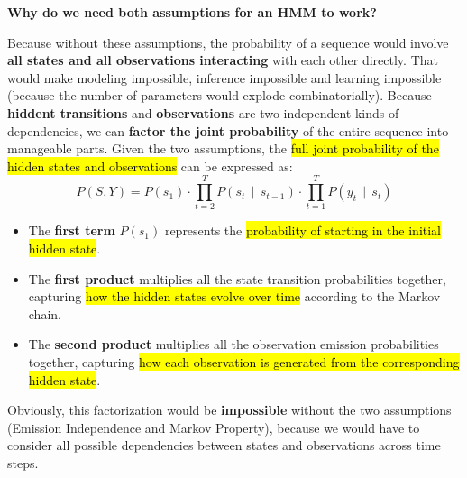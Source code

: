 \begin{flushleft}
    \textcolor{Green3}{ \textbf{Why do we need both assumptions for an HMM to work?}}
\end{flushleft}
Because without these assumptions, the probability of a sequence would involve \textbf{all states and all observations interacting} with each other directly. That would make modeling impossible, inference impossible and learning impossible (because the number of parameters would explode combinatorially). Because \textbf{hiddent transitions} and \textbf{observations} are two independent kinds of dependencies, we can \textbf{factor the joint probability} of the entire sequence into manageable parts. Given the two assumptions, the \hl{full joint probability of the hidden states and observations} can be expressed as:
\begin{equation}
    P\left(S, Y\right) = P\left(s_1\right) \cdot \prod_{t=2}^{T} P\left(s_t \, \mid \, s_{t-1}\right) \cdot \prod_{t=1}^{T} P\left(y_t \, \mid \, s_t\right)
\end{equation}
\begin{itemize}
    \item The \textbf{first term} $P\left(s_1\right)$ represents the \hl{probability of starting in the initial hidden state}.
    \item The \textbf{first product} multiplies all the state transition probabilities together, capturing \hl{how the hidden states evolve over time} according to the Markov chain.
    \item The \textbf{second product} multiplies all the observation emission probabilities together, capturing \hl{how each observation is generated from the corresponding hidden state}.
\end{itemize}
Obviously, this factorization would be \textbf{impossible} without the two assumptions (Emission Independence and Markov Property), because we would have to consider all possible dependencies between states and observations across time steps.

